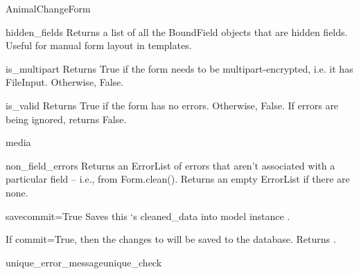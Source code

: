 \documentclass[letterpaper,10pt,english]{sphinxmanual}
\begin{document}
\begin{classdesc}{AnimalChangeForm}
\hypertarget{animal.forms.AnimalChangeForm.hidden_fields}{}\begin{methoddesc}[AnimalChangeForm]{hidden\_fields}{}
Returns a list of all the BoundField objects that are hidden fields.
Useful for manual form layout in templates.
\end{methoddesc}

\hypertarget{animal.forms.AnimalChangeForm.is_multipart}{}\begin{methoddesc}[AnimalChangeForm]{is\_multipart}{}
Returns True if the form needs to be multipart-encrypted, i.e. it has
FileInput. Otherwise, False.
\end{methoddesc}

\hypertarget{animal.forms.AnimalChangeForm.is_valid}{}\begin{methoddesc}[AnimalChangeForm]{is\_valid}{}
Returns True if the form has no errors. Otherwise, False. If errors are
being ignored, returns False.
\end{methoddesc}

\hypertarget{animal.forms.AnimalChangeForm.media}{}\begin{memberdesc}[AnimalChangeForm]{media}\end{memberdesc}

\hypertarget{animal.forms.AnimalChangeForm.non_field_errors}{}\begin{methoddesc}[AnimalChangeForm]{non\_field\_errors}{}
Returns an ErrorList of errors that aren't associated with a particular
field -- i.e., from Form.clean(). Returns an empty ErrorList if there
are none.
\end{methoddesc}

\hypertarget{animal.forms.AnimalChangeForm.save}{}\begin{methoddesc}[AnimalChangeForm]{save}{commit=True}
Saves this `s cleaned\_data into model instance
.

If commit=True, then the changes to  will be saved to the
database. Returns .
\end{methoddesc}

\hypertarget{animal.forms.AnimalChangeForm.unique_error_message}{}\begin{methoddesc}[AnimalChangeForm]{unique\_error\_message}{unique\_check}\end{methoddesc}


\end{classdesc}
\end{document}
